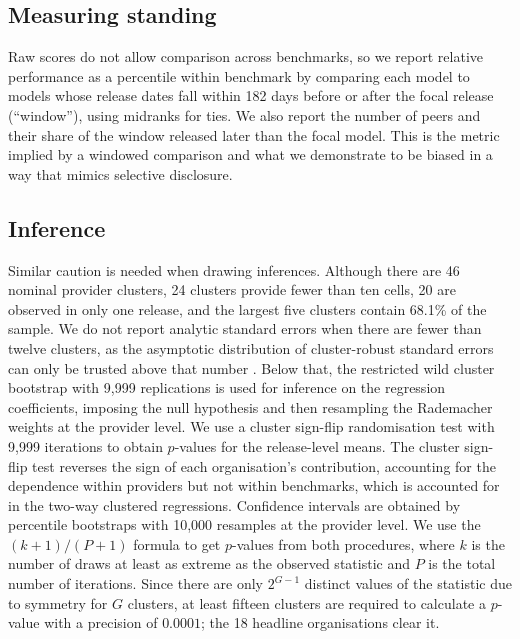 \documentclass{article}
\begin{document}
\subsection{Measuring standing}\label{sec:data-standing}

Raw scores do not allow comparison across benchmarks, so we report relative performance as a percentile within benchmark by comparing each model to models whose release dates fall within 182 days before or after the focal release (``window''), using midranks for ties. We also report the number of peers and their share of the window released later than the focal model. This is the metric implied by a windowed comparison and what we demonstrate to be biased in a way that mimics selective disclosure.

\subsection{Inference}\label{sec:data-inference}
Similar caution is needed when drawing inferences. Although there are 46 nominal provider clusters, 24 clusters provide fewer than ten cells, 20 are observed in only one release, and the largest five clusters contain 68.1\% of the sample. We do not report analytic standard errors when there are fewer than twelve clusters, as the asymptotic distribution of cluster-robust standard errors can only be trusted above that number \citep{cameron2008}. Below that, the restricted wild cluster bootstrap with 9{,}999 replications is used for inference on the regression coefficients, imposing the null hypothesis and then resampling the Rademacher weights at the provider level. We use a cluster sign-flip randomisation test with 9{,}999 iterations to obtain $p$-values for the release-level means. The cluster sign-flip test reverses the sign of each organisation's contribution, accounting for the dependence within providers but not within benchmarks, which is accounted for in the two-way clustered regressions. Confidence intervals are obtained by percentile bootstraps with 10,000 resamples at the provider level. We use the $(k+1)/(P+1)$ formula to get $p$-values from both procedures, where $k$ is the number of draws at least as extreme as the observed statistic and $P$ is the total number of iterations. Since there are only $2^{G-1}$ distinct values of the statistic due to symmetry for $G$ clusters, at least fifteen clusters are required to calculate a $p$-value with a precision of $0.0001$; the 18 headline organisations clear it.
\end{document}
